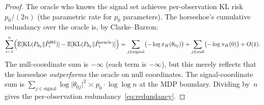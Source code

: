 \documentclass[10pt,a4paper]{amsart}
\newcommand{\E}{\mathbb{E}}
\newcommand{\KL}{\mathrm{KL}}
\newcommand{\abs}[1]{\lvert #1 \rvert}
\newcommand{\piH}{\pi_H}
\begin{document}
\begin{proof}
The oracle who knows the signal set achieves per-observation KL risk $p_0/(2n)$ (the parametric rate for $p_0$ parameters). The horseshoe's cumulative redundancy over the oracle is, by Clarke--Barron:
\[
  \sum_{i=1}^n \Bigl(\E[\KL(P_{\theta_0} \| \hat{P}_i^{\mathrm{HS}})] - \E[\KL(P_{\theta_0} \| \hat{P}_i^{\mathrm{oracle}})]\Bigr)
  = \sum_{j \in \text{signal}} \bigl(-\log\piH(\theta_{0j})\bigr) + \sum_{j \in \text{null}} \bigl(-\log\piH(0)\bigr) + O(1).
\]
The null-coordinate sum is $-\infty$ (each term is $-\infty$), but this merely reflects that the horseshoe \emph{outperforms} the oracle on null coordinates. The signal-coordinate sum is $\sum_{j \in \text{signal}} \log\abs{\theta_{0j}}^2 \asymp p_0 \cdot \log\log n$ at the MDP boundary. Dividing by~$n$ gives the per-observation redundancy~\eqref{eq:redundancy}.
\end{proof}
\end{document}
